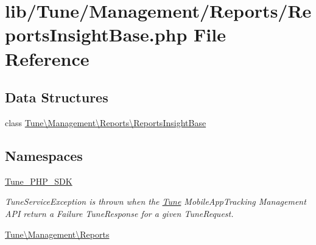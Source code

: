 \hypertarget{ReportsInsightBase_8php}{\section{lib/\-Tune/\-Management/\-Reports/\-Reports\-Insight\-Base.php File Reference}
\label{ReportsInsightBase_8php}
}
\subsection*{Data Structures}
\begin{DoxyCompactItemize}
\item 
class \hyperlink{classTune_1_1Management_1_1Reports_1_1ReportsInsightBase}{Tune\textbackslash{}\-Management\textbackslash{}\-Reports\textbackslash{}\-Reports\-Insight\-Base}
\end{DoxyCompactItemize}
\subsection*{Namespaces}
\begin{DoxyCompactItemize}
\item 
\hyperlink{namespaceTune__PHP__SDK}{Tune\-\_\-\-P\-H\-P\-\_\-\-S\-D\-K}
\begin{DoxyCompactList}\small\item\em Tune\-Service\-Exception is thrown when the \hyperlink{namespaceTune}{Tune} Mobile\-App\-Tracking Management A\-P\-I return a Failure Tune\-Response for a given Tune\-Request. \end{DoxyCompactList}\item 
\hyperlink{namespaceTune_1_1Management_1_1Reports}{Tune\textbackslash{}\-Management\textbackslash{}\-Reports}
\end{DoxyCompactItemize}
